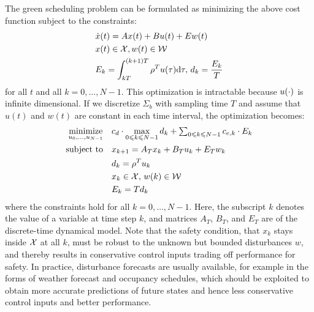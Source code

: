 The green scheduling problem can be formulated as minimizing the above cost function subject to the constraints:
\begin{align*}
  & \dot{x} (t) = Ax (t) + Bu (t) + Ew (t)\\%
  & x (t) \in \mathcal{X}, %
  w (t) \in \mathcal{W}\\%
  & E_k = \int_{kT}^{(k + 1) T} \rho^T u (\tau) \mathd \tau, \, d_k = \frac{E_k}{T}%
\end{align*}
 for all $t$ and all $k = 0, \ldots, N - 1$.
This optimization is intractable because $u (\cdot)$ is infinite
dimensional.
If we discretize $\Sigma_b$ with sampling time $T$ and assume that $u (t)$ and $w (t)$ are constant in each time interval, the optimization becomes:
\begin{align}
  \operatorname*{minimize}_{u_{0}, \ldots, u_{N - 1}} \quad & c_d \cdot \max_{0
  \leqslant k \leqslant N - 1} d_k + \textstyle\sum_{0 \leqslant k \leqslant N - 1}
  c_{e, k} \cdot E_k  \label{eq:MILP}\\
  \text{subject to} \quad & x_{k+1} = A_{T} x_{k} + B_{T} u_{k} + E_{T} w_{k}  \nonumber\\
  & d_k = \rho^T u_{k} \nonumber\\
  & x_{k} \in \mathcal{X} , \, w (k) \in \mathcal{W} \nonumber\\
  & E_k = T d_k \nonumber
\end{align}
where the constraints hold for all $k = 0, \ldots, N - 1$.
Here, the subscript $k$ denotes the value of a variable at time step $k$, and matrices $A_{T}$, $B_{T}$, and $E_{T}$ are of the discrete-time dynamical model.
Note that the safety condition, that $x_k$ stays inside $\mathcal{X}$ at all $k$, must be robust to the unknown but bounded disturbances $w$, and thereby results in conservative control inputs trading off performance for safety.
In practice, disturbance forecasts are usually available, for example in the forms of weather forecast and occupancy schedules, which should be exploited to obtain more accurate predictions of future states and hence less conservative control inputs and better performance.
